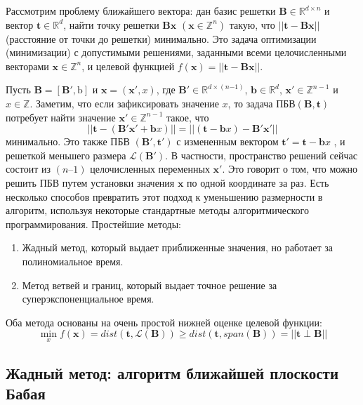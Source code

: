 Рассмотрим проблему ближайшего вектора\cite{lec4}: дан базис решетки $ \mathbf{B} \in \mathbb{R}^{d \times n} $ и вектор $ \mathbf{t} \in \mathbb{R}^d $, найти точку решетки $ \mathbf{Bx} $ $ (\mathbf{x} \in \mathbb{Z}^n) $ такую, что $ ||\mathbf{t - Bx}|| $ (расстояние от точки до решетки) минимально. Это задача оптимизации (минимизации) с допустимыми решениями, заданными всеми целочисленными векторами $ \mathbf{x} \in \mathbb{Z}^n $, и целевой функцией $ f(\mathbf{x}) = ||\mathbf{t - Bx}|| $.

Пусть $ \mathbf{B} = [\mathbf{B}', \mathrm{b}] $ и $ \mathbf{x} = (\mathbf{x}', x) $, где $ \mathbf{B}' \in \mathbb{R}^{d \times \left( n \mathrm{-} 1 \right)} $, $ \mathbf{b} \in \mathbb{R}^d $, $ \mathbf{x}' \in \mathbb{Z}^{n-1} $ и $ x \in \mathbb{Z} $.
Заметим, что если зафиксировать значение $ x $, то задача $ \text{ПБВ}(\mathbf{B, t}) $ потребует найти значение $ \mathbf{x}' \in \mathbb{Z}^{n - 1} $ такое, что 
$$ ||\mathbf{t} - (\mathbf{B}'\mathbf{x}' + \mathbf{b}x)|| = ||(\mathbf{t} - \mathbf{b}x)-\mathbf{B}'\mathbf{x}'|| $$ 
минимально. Это также ПБВ $ (\mathbf{B}', \mathbf{t}') $ с измененным вектором $ \mathbf{t}' = \mathbf{t} - \mathbf{b}x$ , и решеткой меньшего размера $ \mathcal{L}(\mathbf{B}') $. В частности, пространство решений сейчас состоит из $ (n – 1) $ целочисленных переменных $ \mathbf{x}' $. Это говорит о том, что можно решить ПБВ путем установки значения $ \mathbf{x} $ по одной координате за раз.
Есть несколько способов превратить этот подход к уменьшению размерности в алгоритм, используя некоторые стандартные методы алгоритмического программирования. Простейшие методы:

\begin{enumerate}
\item Жадный метод, который выдает приближенные значения, но работает за полиномиальное время.
\item Метод ветвей и границ, который выдает точное решение за суперэкспоненциальное время.
\end{enumerate}

Оба метода основаны на очень простой нижней оценке целевой функции:
$$ \min \limits_{x}f(\mathbf{x}) = dist\left(\mathbf{t}, \mathcal{L}\left(\mathbf{B}\right)\right)\geq dist \left(\mathbf{t}, span\left(\mathbf{B}\right)\right) = ||\mathbf{t} \perp \mathbf{B} || $$

\subsection{Жадный метод: алгоритм ближайшей плоскости Бабая}

